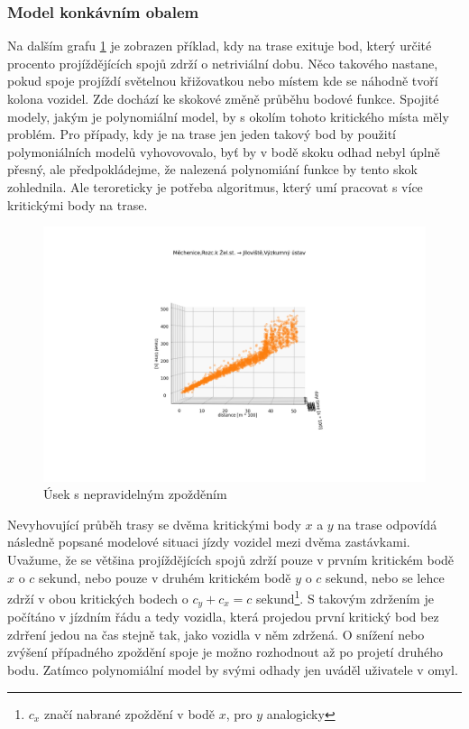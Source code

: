 \subsubsection{Model konkávním obalem}

Na dalším grafu \ref{fig:nepredvidatelne_zdrzeni} je zobrazen příklad, kdy na trase exituje bod, který určité procento projíždějících spojů zdrží o netriviální dobu. Něco takového nastane, pokud spoje projíždí světelnou křižovatkou nebo místem kde se náhodně tvoří kolona vozidel. Zde dochází ke skokové změně průběhu bodové funkce. Spojité modely, jakým je polynomiální model, by s okolím tohoto kritického místa měly problém. Pro případy, kdy je na trase jen jeden takový bod by použití polymoniálních modelů vyhovovovalo, byť by v bodě skoku odhad nebyl úplně přesný, ale předpokládejme, že nalezená polynomiání funkce by tento skok zohlednila. Ale teroreticky je potřeba algoritmus, který umí pracovat s více kritickými body na trase.

\begin{figure}
	\centering
  \includegraphics[width=\linewidth]{../img/nepredvidatelne_zdrzeni.png}
  \caption{Úsek s nepravidelným zpožděním}
  \label{fig:nepredvidatelne_zdrzeni}
\end{figure}

\bigbreak

Nevyhovující průběh trasy se dvěma kritickými body $x$ a $y$ na trase odpovídá následně popsané modelové situaci jízdy vozidel mezi dvěma zastávkami. Uvažume, že se většina projíždějících spojů zdrží pouze v prvním kritickém bodě $x$ o $c$ sekund, nebo pouze v druhém kritickém bodě $y$ o $c$ sekund, nebo se lehce zdrží v obou kritických bodech o $c_y + c_x = c$ sekund\footnote{$c_x$ značí nabrané zpoždění v bodě $x$, pro $y$ analogicky}. S takovým zdržením je počítáno v jízdním řádu a tedy vozidla, která projedou první kritický bod bez zdrření jedou na čas stejně tak, jako vozidla v něm zdržená. O snížení nebo zvýšení případného zpoždění spoje je možno rozhodnout až po projetí druhého bodu. Zatímco polynomiální model by svými odhady jen uváděl uživatele v omyl.


